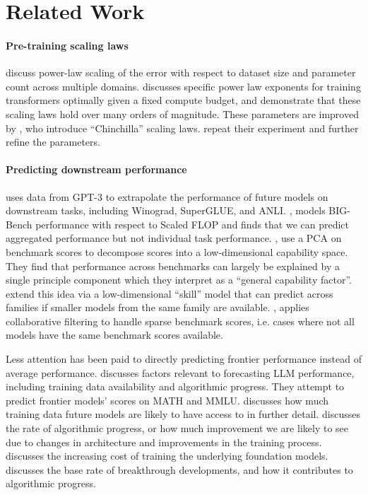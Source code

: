 \section{Related Work}
\label{sec:related_work}

\paragraph{Pre-training scaling laws}
\citet{hestness2017deeplearningscalingpredictable} discuss power-law scaling of the error with respect to dataset size and parameter count across multiple domains.
\citet{kaplan2020scalinglawsneurallanguage} discusses specific power law exponents for training transformers optimally given a fixed compute budget, and demonstrate that these scaling laws hold over many orders of magnitude. These parameters are improved by \citet{hoffmann2022trainingcomputeoptimallargelanguage}, who introduce ``Chinchilla'' scaling laws. \citet{besiroglu2024chinchilla} repeat their experiment and further refine the parameters.

\paragraph{Predicting downstream performance}
\citet{Finnveden_2020} uses data from GPT-3 \citep{brown2020languagemodelsfewshotlearners} to extrapolate the performance of future models on downstream tasks, including Winograd, SuperGLUE, and ANLI.
\citet{owen2024predictablelanguagemodelbenchmark}, models BIG-Bench performance with respect to Scaled FLOP and finds that we can predict aggregated performance but not individual task performance.
\citet{ruan2024observational}, use a PCA on benchmark scores to decompose scores into a low-dimensional capability space. They find that performance across benchmarks can largely be explained by a single principle component which they interpret as a ``general capability factor''. \citet{polo2024sloth} extend this idea via a low-dimensional “skill” model that can predict across families if smaller models from the same family are available.  
\citet{zhang2024collaborativeperformancepredictionlarge}, applies collaborative filtering to handle sparse benchmark scores, i.e. cases where not all models have the same benchmark scores available. 

Less attention has been paid to directly predicting frontier performance instead of average performance. 
\citet{steinhardt2022ForecastingMLBenchmarks} discusses factors relevant to forecasting LLM performance, including training data availability and algorithmic progress. They attempt to predict frontier models' scores on MATH and MMLU. 
\citet{villalobos2024run} discusses how much training data future models are likely to have access to in further detail. 
\citet{ho2024algorithmic} discusses the rate of algorithmic progress, or how much improvement we are likely to see due to changes in architecture and improvements in the training process. 
\citet{cottier2024rising} discusses the increasing cost of training the underlying foundation models.
\citet{erdil2023power} discusses the base rate of breakthrough developments, and how it contributes to algorithmic progress.
%
